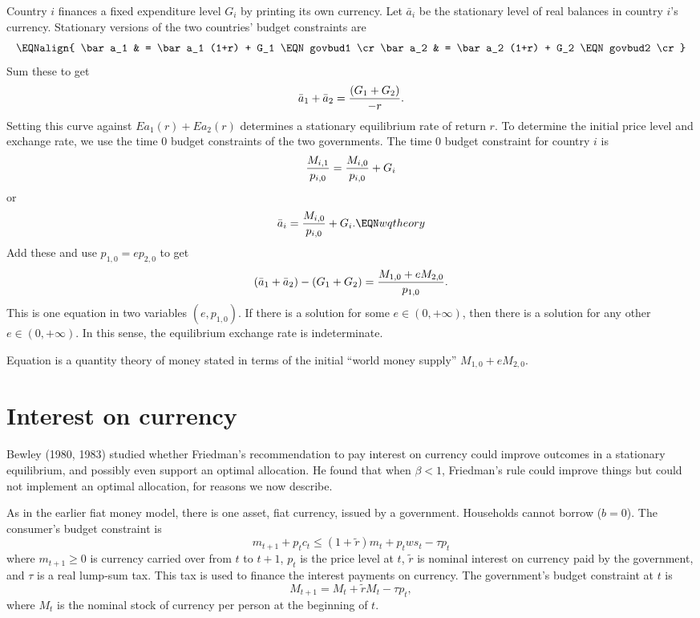 Country $i$ finances a fixed
expenditure level $G_i$ by printing its own currency.
Let $\bar a_i$ be the stationary level of real balances in
country $i$'s currency. \newpage \noindent
Stationary versions  of the two  countries' budget constraints are
$$\EQNalign{ \bar a_1 & = \bar a_1 (1+r) + G_1 \EQN govbud1 \cr
             \bar a_2 & = \bar a_2 (1+r) + G_2 \EQN govbud2 \cr} $$
Sum these to get
 $$  \bar a_1 + \bar a_2 ={ \left( G_1 + G_2  \right) \over - r} .$$
Setting this curve against $E a_1(r) + E a_2(r)$ determines
a stationary equilibrium rate of return $r$.
To determine the initial price level  and exchange rate, we use the
time $0$ budget constraints of the two governments.  The time $0$
budget constraint for country $i$ is
$$ {M_{i,1} \over p_{i,0}}  = {M_{i,0} \over p_{i,0} } + G_i $$
or
$$ \bar a_i = {M_{i,0} \over p_{i,0}} + G_i.  \EQN wqtheory $$
Add these
and use $p_{1,0} = e p_{2,0}$ to get
$$ (\bar a_1 + \bar a_2) - (G_1 + G_2)  =
 {M_{1,0} + e M_{2,0} \over p_{1,0}}. $$
This is one equation in two variables $(e, p_{1,0})$.
If there is a solution for some $e \in (0, +\infty)$, then
there is a solution for any other $e \in (0, + \infty)$.
In this sense, the equilibrium exchange rate is indeterminate.

Equation  is a quantity theory of money stated in
terms of the initial ``world  money supply'' $M_{1,0} + e M_{2,0}$.




\section{Interest on currency}
    Bewley (1980, 1983)  studied whether
Friedman's recommendation to pay interest on currency could
improve outcomes in a stationary equilibrium, and possibly even
support an optimal allocation.  He found  that when
$\beta < 1$, Friedman's
rule could improve things but could
 not implement an optimal allocation, for reasons
we now describe.


As in the earlier fiat money model,
there is one asset,   fiat currency, issued by a government.
Households cannot borrow ($b=0$).
The consumer's budget constraint is
$$ m_{t+1} + p_t c_t \leq (1+\tilde r) m_t + p_t w s_t - \tau p_t $$
where $m_{t+1} \geq 0$ is currency carried over from
$t$ to $t+1$,  $p_t$ is the price level at $t$, $\tilde r$ is
nominal interest  on currency paid by the government, and
$\tau $ is a real lump-sum tax.   This tax is used
to finance the interest payments on currency.
The government's budget constraint   at $t$ is
$$ M_{t+1} = M_t +  \tilde r M_t  - \tau p_t , $$
where $M_t$ is the nominal stock of currency per person
at the beginning of $t$.

